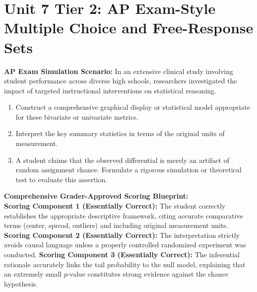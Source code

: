 \section{Unit 7 Tier 2: AP Exam-Style Multiple Choice and Free-Response Sets}
\begin{workbookbox}
\textbf{AP Exam Simulation Scenario:} In an extensive clinical study involving student performance across diverse high schools, researchers investigated the impact of targeted instructional interventions on statistical reasoning.
\begin{enumerate}[label=(\alph*)]
  \item Construct a comprehensive graphical display or statistical model appropriate for these bivariate or univariate metrics.
  \item Interpret the key summary statistics in terms of the original units of measurement.
  \item A student claims that the observed differential is merely an artifact of random assignment chance. Formulate a rigorous simulation or theoretical test to evaluate this assertion.
\end{enumerate}
\textbf{Comprehensive Grader-Approved Scoring Blueprint:}\\
\textbf{Scoring Component 1 (Essentially Correct):} The student correctly establishes the appropriate descriptive framework, citing accurate comparative terms (center, spread, outliers) and including original measurement units.
\textbf{Scoring Component 2 (Essentially Correct):} The interpretation strictly avoids causal language unless a properly controlled randomized experiment was conducted.
\textbf{Scoring Component 3 (Essentially Correct):} The inferential rationale accurately links the tail probability to the null model, explaining that an extremely small $p$-value constitutes strong evidence against the chance hypothesis.
\end{workbookbox}\vspace{6pt}

